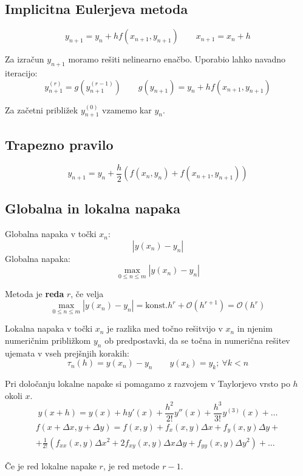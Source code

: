 \begin{multicols}{5}
\subsection*{Implicitna Eulerjeva metoda}
\[ y_{n+1} = y_n + hf(x_{n+1}, y_{n+1}) \qquad x_{n+1} = x_n + h\]

Za izračun $y_{n+1}$ moramo rešiti nelinearno enačbo. Uporabio lahko navadno iteracijo:
\[ y_{n+1}^{(r)} = g(y_{n+1}^{(r-1)}) \qquad g(y_{n+1}) = y_n + hf(x_{n+1}, y_{n+1}) \]

Za začetni približek $y_{n+1}^{(0)}$ vzamemo kar $y_n$.

\subsection*{Trapezno pravilo}
\[ y_{n+1} = y_n + \frac{h}{2}\left(f(x_n, y_n) + f(x_{n+1}, y_{n+1})\right)\]

\subsection*{Globalna in lokalna napaka}
Globalna napaka v točki $x_n$:
\[ |y(x_n) - y_n | \]
Globalna napaka:
\[\max_{0 \leq n \leq m} |y(x_n) - y_n |\]

Metoda je \textbf{reda} $r$, če velja
\[ \max_{0 \leq n \leq m} |y(x_n) - y_n| = \text{konst.} h^r + \mathcal{O}\left(h^{r+1}\right) = \mathcal{O}\left(h^r\right)\]

Lokalna napaka v točki $x_n$ je razlika med točno rešitvijo v $x_n$ in njenim numeričnim približkom $y_n$
ob predpostavki, da se točna in numerična rešitev ujemata v vseh prejšnjih korakih:
\[ \tau_n(h) = y(x_n) - y_n \qquad y(x_k) = y_k; \ \forall k < n\]

Pri določanju lokalne napake si pomagamo z razvojem v Taylorjevo vrsto po $h$ okoli $x$.
\[ y(x+h) = y(x) + hy'(x)+\frac{h^2}{2!}y''(x) + \frac{h^3}{3!}y^{(3)}(x) + \dots\]
\begin{multline*}
    f(x + \Delta x, y + \Delta y) = f(x,y) + f_x(x,y)\Delta x + f_y(x,y) \Delta y + \\
    + \frac{1}{2!}\left( f_{xx}(x,y)\Delta x^2 + 2 f_{xy}(x,y) \Delta x \Delta y + f_{yy}(x,y) \Delta y^2\right) + \dots
\end{multline*}

Če je red lokalne napake $r$, je red metode $r-1$.


\end{multicols}
